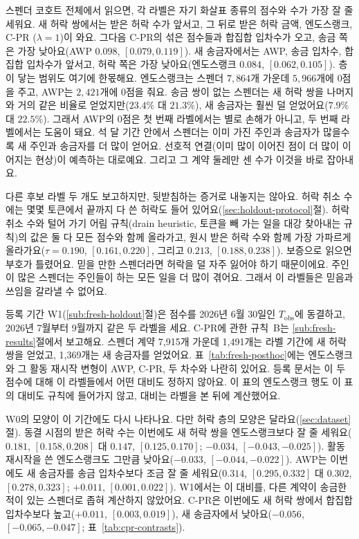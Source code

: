 스펜더 코호트 전체에서 읽으면, 각 라벨은 자기 화살표 종류의 점수와 수가 가장 잘 줄 세워요. 새 허락 쌍에서는 받은 허락 수가 앞서고, 그 뒤로 받은 허락 금액, 엔도스랭크, \mbox{C-PR} ($\lambda=1$)이 와요. 그다음 \mbox{C-PR}의 섞은 점수들과 합집합 입차수가 오고, 송금 쪽은 가장 낮아요(AWP $0.098$, $[0.079,0.119]$). 새 송금자에서는 AWP, 송금 입차수, 합집합 입차수가 앞서고, 허락 쪽은 가장 낮아요(엔도스랭크 $0.084$, $[0.062,0.105]$). 층이 닿는 범위도 여기에 한몫해요. 엔도스랭크는 스펜더 $7{,}864$개 가운데 $5{,}966$개에 0점을 주고, AWP는 $2{,}421$개에 0점을 줘요. 송금 쌍이 없는 스펜더는 새 허락 쌍을 나머지와 거의 같은 비율로 얻었지만($23.4\%$ 대 $21.3\%$), 새 송금자는 훨씬 덜 얻었어요($7.9\%$ 대 $22.5\%$). 그래서 AWP의 0점은 첫 번째 라벨에서는 별로 손해가 아니고, 두 번째 라벨에서는 도움이 돼요. 석 달 기간 안에서 스펜더는 이미 가진 주인과 송금자가 많을수록 새 주인과 송금자를 더 많이 얻어요. 선호적 연결(이미 많이 이어진 점이 더 많이 이어지는 현상)이 예측하는 대로예요\parencite{barabasi1999scaling}. 그리고 그 계약 둘레만 센 수가 이것을 바로 잡아내요.

다른 후보 라벨 두 개도 보고하지만, 뒷받침하는 증거로 내놓지는 않아요. 허락 취소 수에는 몇몇 토큰에서 끝까지 다 쓴 허락도 들어 있어요(\ref{sec:holdout-protocol}절). 허락 취소 수와 털어 가기 어림 규칙(drain heuristic, 토큰을 빼 가는 일을 대강 찾아내는 규칙)의 값은 둘 다 모든 점수와 함께 올라가고, 원시 받은 허락 수와 함께 가장 가파르게 올라가요($\tau=0.190$, $[0.161,0.220]$, 그리고 $0.213$, $[0.188,0.238]$). 보증으로 읽으면 부호가 틀렸어요. 믿을 만한 스펜더라면 허락을 덜 자주 잃어야 하기 때문이에요. 주인이 많은 스펜더는 주인들이 하는 모든 일을 더 많이 겪어요. 그래서 이 라벨들은 믿음과 쓰임을 갈라낼 수 없어요.


등록 기간 W1(\ref{sub:fresh-holdout}절)은 점수를 2026년 6월 30일인 $T_{\mathrm{obs}}$에 동결하고, 2026년 7월부터 9월까지 같은 두 라벨을 세요. \mbox{C-PR}에 관한 규칙~B는 \ref{sub:fresh-results}절에서 보고해요. 스펜더 계약 7,915개 가운데 1,491개는 라벨 기간에 새 허락 쌍을 얻었고, 1,369개는 새 송금자를 얻었어요. 표~\ref{tab:fresh-posthoc}에는 엔도스랭크와 그 활동 재시작 변형이 AWP, \mbox{C-PR}, 두 차수와 나란히 있어요. 등록 문서는 이 두 점수에 대해 이 라벨들에서 어떤 대비도 정하지 않아요. 이 표의 엔도스랭크 행도 이 표의 대비도 규칙에 들어가지 않고, 대비는 라벨을 본 뒤에 계산했어요.

W0의 모양이 이 기간에도 다시 나타나요. 다만 허락 층의 모양은 달라요(\ref{sec:dataset}절). 동결 시점의 받은 허락 수는 이번에도 새 허락 쌍을 엔도스랭크보다 잘 줄 세워요($0.181$, $[0.158,0.208]$ 대 $0.147$, $[0.125,0.170]$; $-0.034$, $[-0.043,-0.025]$). 활동 재시작을 쓴 엔도스랭크도 그만큼 낮아요($-0.033$, $[-0.044,-0.022]$). AWP는 이번에도 새 송금자를 송금 입차수보다 조금 잘 줄 세워요($0.314$, $[0.295,0.332]$ 대 $0.302$, $[0.278,0.323]$; $+0.011$, $[0.001,0.022]$). W1에서는 이 대비를, 다른 계약이 송금한 적이 있는 스펜더로 좁혀 계산하지 않았어요. \mbox{C-PR}은 이번에도 새 허락 쌍에서 합집합 입차수보다 높고($+0.011$, $[0.003,0.019]$), 새 송금자에서 낮아요($-0.056$, $[-0.065,-0.047]$; 표~\ref{tab:cpr-contrasts}).

